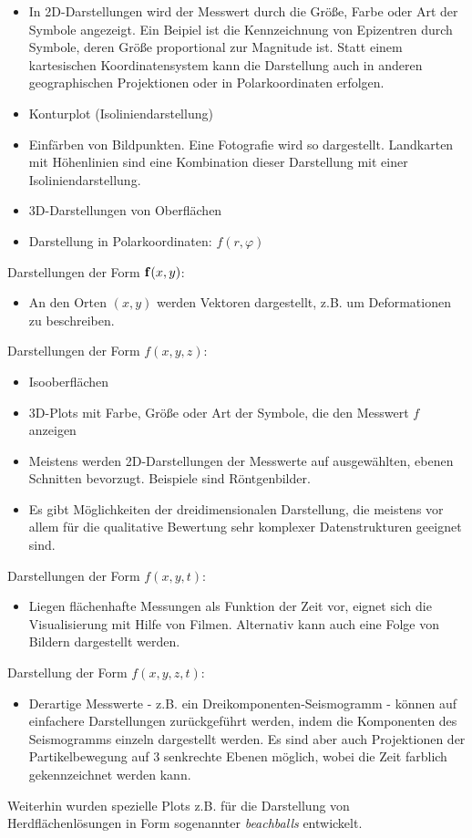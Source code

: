 \begin{itemize}
\item In 2D-Darstellungen wird der Messwert durch die Größe, Farbe oder Art der Symbole angezeigt. Ein Beipiel ist die Kennzeichnung von Epizentren durch Symbole, deren Größe proportional zur Magnitude ist. Statt einem kartesischen Koordinatensystem kann die Darstellung auch in anderen geographischen Projektionen oder in Polarkoordinaten erfolgen.
\item Konturplot (Isoliniendarstellung)
\item Einfärben von Bildpunkten. Eine Fotografie wird so dargestellt. Landkarten mit Höhenlinien sind eine Kombination dieser Darstellung mit einer Isoliniendarstellung.
\item 3D-Darstellungen von Oberflächen 
\item Darstellung in Polarkoordinaten: $f(r,\varphi)$
  \end{itemize}
Darstellungen der Form $ {\bf f}(x,y)$:
\begin{itemize}
\item
An den Orten $(x,y)$ werden Vektoren dargestellt, z.B. um Deformationen zu beschreiben.
\end{itemize}
Darstellungen der Form $f(x,y,z)$:
\begin{itemize}
\item Isooberflächen   
\item 3D-Plots mit Farbe, Größe oder Art der Symbole, die den Messwert $f$ anzeigen
\item Meistens werden 2D-Darstellungen der Messwerte auf ausgewählten, ebenen Schnitten bevorzugt. Beispiele sind Röntgenbilder.  
\item Es gibt Möglichkeiten der dreidimensionalen Darstellung, die meistens vor allem für die qualitative Bewertung sehr komplexer Datenstrukturen geeignet sind. 
  \end{itemize}
  
\noindent Darstellungen der Form $f(x,y,t)$: \begin{itemize}
\item Liegen flächenhafte Messungen als Funktion der Zeit vor, eignet sich die Visualisierung mit Hilfe von Filmen. Alternativ kann auch eine Folge von Bildern dargestellt werden.  
  \end{itemize}
Darstellung der Form $f(x,y,z,t)$:
\begin{itemize}
\item Derartige Messwerte - z.B. ein Dreikomponenten-Seismogramm - können auf einfachere Darstellungen zurückgeführt werden, indem die Komponenten des Seismogramms einzeln dargestellt werden. Es sind aber auch Projektionen der Partikelbewegung auf 3 senkrechte Ebenen möglich, wobei die Zeit farblich gekennzeichnet werden kann.
\end{itemize}
Weiterhin wurden spezielle Plots z.B. für die Darstellung von Herdflächenlösungen in Form sogenannter \textit{beachballs} entwickelt. 

